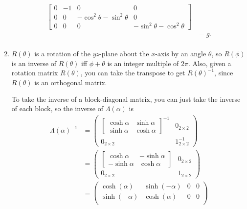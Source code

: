 \documentclass{article}
\begin{document}
\begin{enumerate}[label=(\alph*)]
\begin{align*}
\begin{bmatrix}
                0 & -1 & 0 & 0 \\
                0 & 0 & -\cos^2 \theta - \sin^2 \theta & 0 \\
                0 & 0 & 0 & -\sin^2 \theta - \cos^2 \theta
            \end{bmatrix} \\
            &= g. \\
    \end{align*}
\item $R(\theta)$ is a rotation of the $yz$-plane about the $x$-axis by an angle $\theta$, so $R(\phi)$ is an inverse of $R(\theta)$ iff $\phi+\theta$ is an integer multiple of $2 \pi$. Also, given a rotation matrix $R(\theta)$, you can take the transpose to get $R(\theta)^{-1}$, since $R(\theta)$ is an orthogonal matrix.
    \par
    To take the inverse of a block-diagonal matrix, you can just take the inverse of each block, so the inverse of $\Lambda(\alpha)$ is \begin{align*}
        \Lambda(\alpha)^{-1} &= \begin{pmatrix}
            \begin{bmatrix}
                \cosh \alpha & \sinh \alpha \\
                \sinh \alpha & \cosh \alpha
            \end{bmatrix}^{-1} & 0_{2 \times 2} \\
            0_{2 \times 2} & 1_{2 \times 2}^{-1}
        \end{pmatrix} \\
                             &= \begin{pmatrix}
                                 \begin{bmatrix}
                                     \cosh \alpha & -\sinh \alpha \\
                                     -\sinh \alpha & \cosh \alpha
                                 \end{bmatrix} & 0_{2 \times 2} \\
                                 0_{2 \times 2} & 1_{2 \times 2}
                             \end{pmatrix} \\
                             &= \begin{pmatrix}
                                 \cosh(\alpha) & \sinh(-\alpha) & 0 & 0 \\
                                 \sinh(-\alpha) & \cosh(\alpha) & 0 & 0 \\

\end{pmatrix}
\end{align*}
\end{enumerate}
\end{document}
